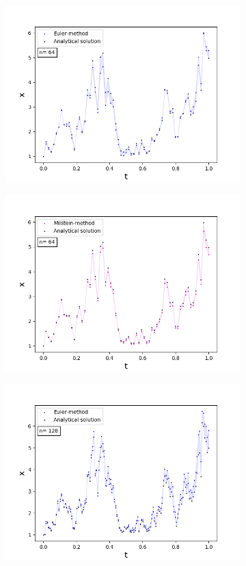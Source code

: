 \begin{figure}[!h]
\begin{subfigure}{0.49\linewidth}
     \includegraphics[scale=0.4]{Content/Graphics/Appendix/3gbm2}
   \end{subfigure}
   \begin{subfigure}{0.49\linewidth} \centering
     \includegraphics[scale=0.4]{Content/Graphics/Appendix/4gbm2}
   \end{subfigure}
   \begin{subfigure}{0.49\linewidth} \centering
     \includegraphics[scale=0.4]{Content/Graphics/Appendix/5gbm2}

\end{subfigure}
\end{figure}
